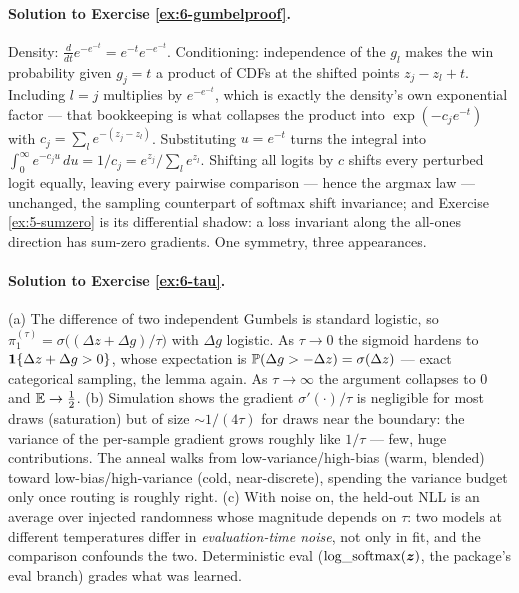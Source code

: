 \paragraph{Solution to Exercise \ref{ex:6-gumbelproof}.}
Density: $\frac{d}{dt}e^{-e^{-t}} = e^{-t}e^{-e^{-t}}$. Conditioning:
independence of the $g_l$ makes the win probability given $g_j = t$ a
product of CDFs at the shifted points $z_j - z_l + t$. Including
$l = j$ multiplies by $e^{-e^{-t}}$, which is exactly the density's own
exponential factor --- that bookkeeping is what collapses the product
into $\exp(-c_j e^{-t})$ with $c_j = \sum_l e^{-(z_j - z_l)}$.
Substituting $u = e^{-t}$ turns the integral into $\int_0^\infty
e^{-c_j u}\,du = 1/c_j = e^{z_j}/\sum_l e^{z_l}$. Shifting all logits
by $c$ shifts every perturbed logit equally, leaving every pairwise
comparison --- hence the argmax law --- unchanged, the sampling
counterpart of softmax shift invariance; and Exercise
\ref{ex:5-sumzero} is its differential shadow: a loss invariant along
the all-ones direction has sum-zero gradients. One symmetry, three
appearances.

\paragraph{Solution to Exercise \ref{ex:6-tau}.}
(a) The difference of two independent Gumbels is standard logistic, so
$\pi_1^{(\tau)} = \sigma\bigl((\Delta z + \Delta g)/\tau\bigr)$ with
$\Delta g$ logistic. As $\tau \to 0$ the sigmoid hardens to
$\mathbf{1}\{\Delta z + \Delta g > 0\}$, whose expectation is $\mathbb{P}(\Delta g >
-\Delta z) = \sigma(\Delta z)$ --- exact categorical sampling, the
lemma again. As $\tau \to \infty$ the argument collapses to $0$ and
$\mathbb{E} \to \tfrac12$. (b) Simulation shows the gradient
$\sigma'(\cdot)/\tau$ is negligible for most draws (saturation) but of
size $\sim 1/(4\tau)$ for draws near the boundary: the variance of the
per-sample gradient grows roughly like $1/\tau$ --- few, huge
contributions. The anneal walks from low-variance/high-bias (warm,
blended) toward low-bias/high-variance (cold, near-discrete), spending
the variance budget only once routing is roughly right. (c) With noise
on, the held-out NLL is an average over injected randomness whose
magnitude depends on $\tau$: two models at different temperatures
differ in \emph{evaluation-time noise}, not only in fit, and the
comparison confounds the two. Deterministic eval
($\operatorname{log\_softmax}(\bm{z})$, the package's eval branch) grades
what was learned.


